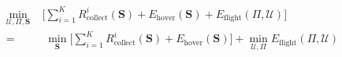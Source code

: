 \documentclass[sigconf]{acmart}
\begin{document}
\begin{equation}
\begin{aligned}
\min_{\mathcal{U},\Pi,\mathbf{S}} \; &\Biggl[\sum_{i=1}^K R_{\mathrm{collect}}^i(\mathbf{S}) 
+ E_{\mathrm{hover}}(\mathbf{S}) + E_{\mathrm{flight}}(\Pi,\mathcal{U})\Biggr] \\
=&\;\min_{\mathbf{S}} \Biggl[\sum_{i=1}^K R_{\mathrm{collect}}^i(\mathbf{S}) 
+ E_{\mathrm{hover}}(\mathbf{S})\Biggr]+\min_{\mathcal{U},\Pi} E_{\mathrm{flight}}(\Pi,\mathcal{U})  
\end{aligned}
\end{equation}



\end{document}
